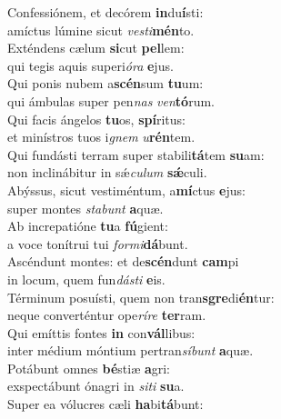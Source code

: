 \evenverse Confessiónem, et decórem \textbf{in}du\textbf{í}sti:~\*\\
\evenverse amíctus lúmine sicut \textit{ve}\textit{sti}\textbf{mén}to.\\
\oddverse Exténdens cælum \textbf{si}cut \textbf{pel}lem:~\*\\
\oddverse qui tegis aquis superi\textit{ó}\textit{ra} \textbf{e}jus.\\
\evenverse Qui ponis nubem a\textbf{scén}sum \textbf{tu}um:~\*\\
\evenverse qui ámbulas super pen\textit{nas} \textit{ven}\textbf{tó}rum.\\
\oddverse Qui facis ángelos \textbf{tu}os, \textbf{spí}ritus:~\*\\
\oddverse et minístros tuos i\textit{gnem} \textit{u}\textbf{rén}tem.\\
\evenverse Qui fundásti terram super stabili\textbf{tá}tem \textbf{su}am:~\*\\
\evenverse non inclinábitur in sǽ\textit{cu}\textit{lum} \textbf{sǽ}culi.\\
\oddverse Abýssus, sicut vestiméntum, a\textbf{mí}ctus \textbf{e}jus:~\*\\
\oddverse super montes \textit{sta}\textit{bunt} \textbf{a}quæ.\\
\evenverse Ab increpatióne \textbf{tu}a \textbf{fú}gient:~\*\\
\evenverse a voce tonítrui tui \textit{for}\textit{mi}\textbf{dá}bunt.\\
\oddverse Ascéndunt montes: et de\textbf{scén}dunt \textbf{cam}pi~\*\\
\oddverse in locum, quem fun\textit{dá}\textit{sti} \textbf{e}is.\\
\evenverse Términum posuísti, quem non tran\textbf{sgre}di\textbf{én}tur:~\*\\
\evenverse neque converténtur ope\textit{rí}\textit{re} \textbf{ter}ram.\\
\oddverse Qui emíttis fontes \textbf{in} con\textbf{vál}libus:~\*\\
\oddverse inter médium móntium pertran\textit{sí}\textit{bunt} \textbf{a}quæ.\\
\evenverse Potábunt omnes \textbf{bé}stiæ \textbf{a}gri:~\*\\
\evenverse exspectábunt ónagri in \textit{si}\textit{ti} \textbf{su}a.\\
\oddverse Super ea vólucres cæli \textbf{ha}bi\textbf{tá}bunt:~\*\\
